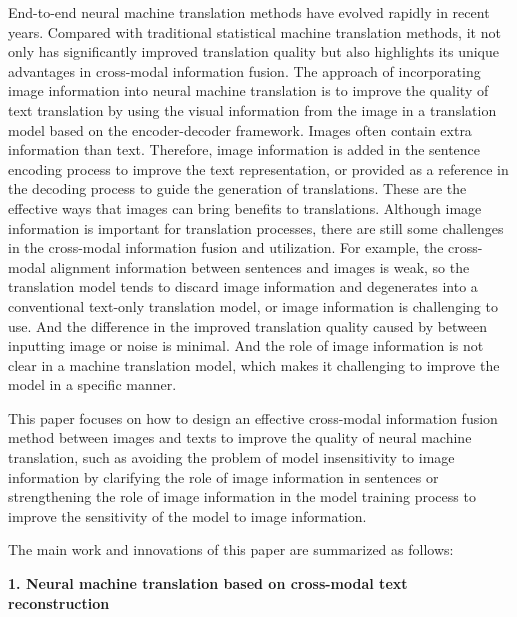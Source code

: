 End-to-end neural machine translation methods have evolved rapidly in recent years. Compared with traditional statistical machine translation methods, it not only has significantly improved translation quality but also highlights its unique advantages in cross-modal information fusion. The approach of incorporating image information into neural machine translation is to improve the quality of text translation by using the visual information from the image in a translation model based on the encoder-decoder framework. Images often contain extra information than text. Therefore, image information is added in the sentence encoding process to improve the text representation, or provided as a reference in the decoding process to guide the generation of translations. These are the effective ways that images can bring benefits to translations. Although image information is important for translation processes, there are still some challenges in the cross-modal information fusion and utilization. 
For example, the cross-modal alignment information between sentences and images is weak, so the translation model tends to discard image information and degenerates into a conventional text-only translation model, or image information is challenging to use. And the difference in the improved translation quality caused by between inputting image or noise is minimal. And the role of image information is not clear in a machine translation model, which makes it challenging to improve the model in a specific manner.

This paper focuses on how to design an effective cross-modal information fusion method between images and texts to improve the quality of neural machine translation, such as avoiding the problem of model insensitivity to image information by clarifying the role of image information in sentences or strengthening the role of image information in the model training process to improve the sensitivity of the model to image information. 

The main work and innovations of this paper are summarized as follows:

\textbf{1. Neural machine translation based on cross-modal text reconstruction}

